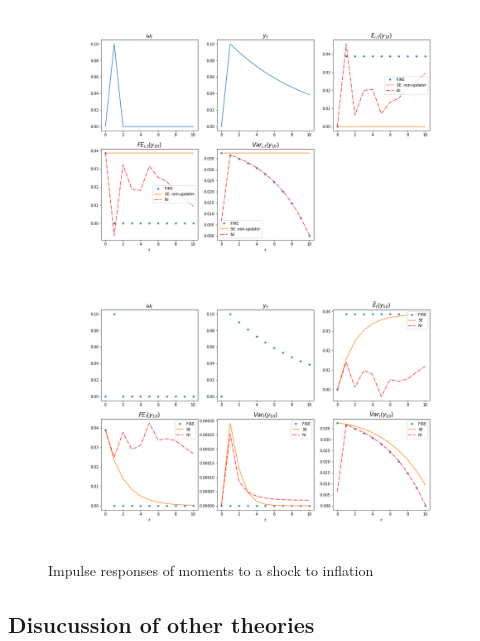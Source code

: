 \documentclass[]{article}
\begin{document}
\begin{figure}[h]\label{ir_popind}
	\centering
	\includegraphics[width=13cm]{figures/ir_indseni.png}
	\includegraphics[width=13cm]{figures/ir_popseni.png} \\
	\caption{Impulse responses of moments to a shock to inflation}
\end{figure}


\subsection{Disucussion of other theories}
\end{document}
